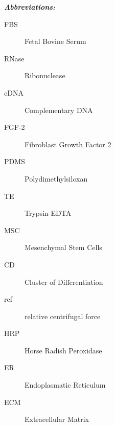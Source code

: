 \textit{\textbf{Abbreviations:}}
\begin{description}
\item[FBS] Fetal Bovine Serum
\item[RNase] Ribonuclease
\item[cDNA] Complementary DNA
\item[FGF-2] Fibroblast Growth Factor 2
\item[PDMS] Polydimethylsiloxan
\item[TE] Trypsin-EDTA
\item[MSC] Mesenchymal Stem Cells 
\item[CD] Cluster of Differentiation
\item[rcf] relative centrifugal force
\item[HRP] Horse Radish Peroxidase
\item[ER] Endoplasmatic Reticulum
\item[ECM] Extracellular Matrix
\end{description}